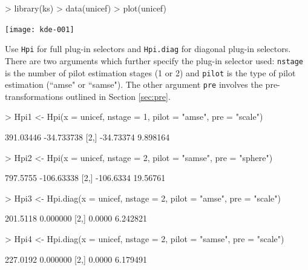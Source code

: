 \documentclass[a4paper,11pt]{article}
\begin{document}
\begin{center}
\begin{Schunk}
\begin{Sinput}
> library(ks)
> data(unicef)
> plot(unicef)
\end{Sinput}
\end{Schunk}
\texttt{[image: kde-001]}
\end{center}

Use \texttt{Hpi} for 
full plug-in selectors and \texttt{Hpi.diag} for diagonal plug-in selectors.
There are two arguments which further specify the plug-in selector
used: \texttt{nstage} is the number of pilot estimation stages (1 or 2)
and \texttt{pilot} is the type of pilot estimation (``amse" or ``samse").
The other argument \texttt{pre} involves the pre-transformations outlined
in Section \ref{sec:pre}. 
\begin{Schunk}
\begin{Sinput}
> Hpi1 <- Hpi(x = unicef, nstage = 1, pilot = "amse", pre = "scale")
\end{Sinput}
\begin{Soutput}
          [,1]       [,2]
[1,] 391.03446 -34.733738
[2,] -34.73374   9.898164
\end{Soutput}
\begin{Sinput}
> Hpi2 <- Hpi(x = unicef, nstage = 2, pilot = "samse", pre = "sphere")
\end{Sinput}
\begin{Soutput}
          [,1]       [,2]
[1,]  797.5755 -106.63338
[2,] -106.6334   19.56761
\end{Soutput}
\begin{Sinput}
> Hpi3 <- Hpi.diag(x = unicef, nstage = 2, pilot = "amse", pre = "scale")
\end{Sinput}
\begin{Soutput}
         [,1]     [,2]
[1,] 201.5118 0.000000
[2,]   0.0000 6.242821
\end{Soutput}
\begin{Sinput}
> Hpi4 <- Hpi.diag(x = unicef, nstage = 2, pilot = "samse", pre = "scale")
\end{Sinput}
\begin{Soutput}
         [,1]     [,2]
[1,] 227.0192 0.000000
[2,]   0.0000 6.179491
\end{Soutput}
\end{Schunk}
\end{document}
